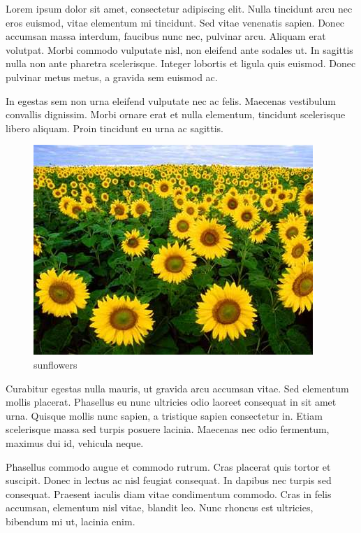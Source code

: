 \documentclass[a4paper, 12pt]{article}
\begin{document}
	Lorem ipsum dolor sit amet, consectetur adipiscing elit. Nulla tincidunt arcu nec eros euismod, vitae elementum mi tincidunt. Sed vitae venenatis sapien. Donec accumsan massa interdum, faucibus nunc nec, pulvinar arcu. Aliquam erat volutpat. Morbi commodo vulputate nisl, non eleifend ante sodales ut. In sagittis nulla non ante pharetra scelerisque. Integer lobortis et ligula quis euismod. Donec pulvinar metus metus, a gravida sem euismod ac.
	
	In egestas sem non urna eleifend vulputate nec ac felis. Maecenas vestibulum convallis dignissim. Morbi ornare erat et nulla elementum, tincidunt scelerisque libero aliquam. Proin tincidunt eu urna ac sagittis.
	\begin{figure}
		\includegraphics[scale=.5]{images/f4.jpg}
		\caption{sunflowers}
	\end{figure} 
	Curabitur egestas nulla mauris, ut gravida arcu accumsan vitae. Sed elementum mollis placerat. Phasellus eu nunc ultricies odio laoreet consequat in sit amet urna. Quisque mollis nunc sapien, a tristique sapien consectetur in. Etiam scelerisque massa sed turpis posuere lacinia. Maecenas nec odio fermentum, maximus dui id, vehicula neque.
	
	Phasellus commodo augue et commodo rutrum. Cras placerat quis tortor et suscipit. Donec in lectus ac nisl feugiat consequat. In dapibus nec turpis sed consequat. Praesent iaculis diam vitae condimentum commodo. Cras in felis accumsan, elementum nisl vitae, blandit leo. Nunc rhoncus est ultricies, bibendum mi ut, lacinia enim.
	
\end{document}
